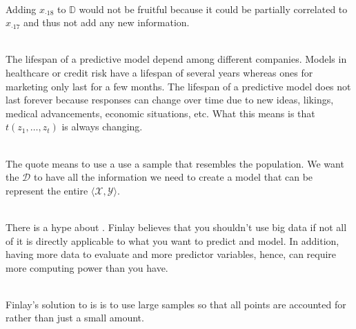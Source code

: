 \documentclass[12pt]{article}
\begin{document}
\begin{enumerate}
 \\
Adding $x_{\cdot 18}$ to $\mathbb{D}$ would not be fruitful because it could be partially correlated to $x_{\cdot 17}$ and thus not add any new information. 

 \\
The lifespan of a predictive model depend among different companies. Models in healthcare or credit risk have a lifespan of several years whereas ones for marketing only last for a few months. The lifespan of a predictive model does not last forever because responses can change over time due to new ideas, likings, medical advancements, economic situations, etc. What this means is that $t(z_1,\ldots,z_t)$ is always changing. 

 \\
The quote  means to use a use a sample that resembles the population. We want the $\mathcal{D}$ to have all the information we need to create a model that can be represent the entire $\langle \mathcal{X}, \mathcal{Y} \rangle$. 

 \\
There is a hype about . Finlay believes that you shouldn't use big data if not all of it is directly applicable to what you want to predict and model. In addition, having more data to evaluate and more predictor variables, hence, can require more computing power than you have. 

 \\
Finlay's solution to  is is to use large samples so that all points are accounted for rather than just a small amount.


\end{enumerate}
\end{document}
